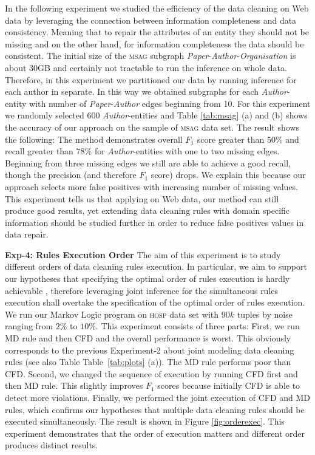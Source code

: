 In the following experiment we studied the efficiency of the data cleaning on Web data by leveraging the connection between information completeness and data consistency. Meaning that to repair the attributes of an entity they should not be missing and on the other hand, for information completeness the data should be consistent. The initial size of the \textsc{msag} subgraph \textit{Paper}-\textit{Author}-\textit{Organisation} is about 30GB and certainly not tractable to run the inference on whole data. Therefore, in this experiment we partitioned our data by running inference for each author in separate. In this way we obtained subgraphs for each \textit{Author}-entity with number of \textit{Paper}-\textit{Author} edges beginning from 10. For this experiment we randomly selected 600 \textit{Author}-entities and Table \ref{tab:msag} (a) and (b) shows the accuracy of our approach on the sample of \textsc{msag} data set. The result shows the following: The method demonstrates overall $F_1$ score greater than $50\%$ and recall greater than $78\%$ for \textit{Author}-entities with one to two missing edges. Beginning from three missing edges we still are able to achieve a good recall, though the precision (and therefore $F_1$ score) drops. We explain this because our approach selects more false positives with increasing number of missing values. This experiment tells us that applying on Web data, our method can still produce good results, yet extending data cleaning rules with domain specific information should be studied further in order to reduce false positives values in data repair.

\textbf{Exp-4: Rules Execution Order}
The aim of this experiment is to study different orders of data cleaning rules execution. In particular, we aim to support our hypotheses that specifying the optimal order of rules execution is hardly achievable \cite{Dallachiesa:2013:NCD:2463676.2465327}, therefore leveraging joint inference for the simultaneous rules execution shall overtake the specification of the optimal order of rules execution. We run our Markov Logic program on \textsc{hosp} data set with $90k$ tuples by noise ranging from $2\%$ to $10\%$. This experiment consists of three parts: First, we run MD rule and then CFD and the overall performance is worst. This obviously corresponds to the previous Experiment-2 about joint modeling data cleaning rules (see also Table Table~\ref{tab:plots} (a)). The MD rule performs poor than CFD. Second, we changed the sequence of execution by running CFD first and then MD rule. This slightly improves $F_1$ scores because initially CFD is able to detect more violations. Finally, we performed the joint execution of CFD and MD rules, which confirms our hypotheses that multiple data cleaning rules should be executed simultaneously. The result is shown in Figure \ref{fig:orderexec}. This experiment demonstrates that the order of execution matters and different order produces distinct results.


